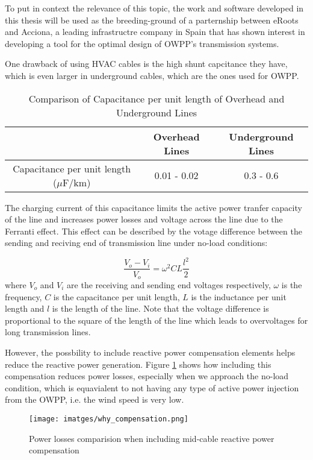 \documentclass[a4paper,11pt, titlepage, twoside]{article}
\begin{document}
To put in context the relevance of this topic, the work and software developed in this thesis will be used
as the breeding-ground of a parternship between eRoots and Acciona, a leading infrastructre company in Spain that has shown interest in developing a tool for the optimal design
of OWPP's transmission systems.

One drawback of using HVAC cables is the high shunt capcitance they have, which is even larger in underground cables,
which are the ones used for OWPP.

\begin{table}[h]
    \centering
    \begin{tabular}{|c|c|c|}
    \hline
     & Overhead Lines & Underground Lines \\
     \hline
    Capacitance per unit length ($\mu$F/km) & 0.01 - 0.02  & 0.3 - 0.6 \\
    \hline
    \end{tabular}
    \caption{Comparison of Capacitance per unit length of Overhead and Underground Lines}
    \label{tab:capacitance_comparison}
    \end{table}

The charging current of this capacitance limits the active power tranfer capacity of the line and increases
power losses and voltage across the line due to the Ferranti effect\cite{ferranti}. This effect can be described by the votage difference between the sending and reciving end of transmission line under no-load conditions:

\begin{equation}
    \frac{V_{o} - V_{i}}{V_{o}} = \omega^2CL\frac{l^2}{2}
\end{equation}
where $V_{o}$ and $V_{i}$ are the receiving and sending end voltages respectively, $\omega$ is the frequency, $C$ is the capacitance per unit length, $L$ is the inductance per unit length and $l$ is the length of the line. Note that the voltage difference is
proportional to the square of the length of the line which leads to overvoltages for long transmission lines.\par

However, the possbility to include reactive power compensation elements helps reduce the reactive power generation. Figure \ref{fig:whycomp} shows how including
this compensation reduces power losses, especially when we approach the no-load condition, which is equavialent to not having any type of active power injection from
the OWPP, i.e. the wind speed is very low.
\begin{figure}[h] %
	\centering
	\texttt{[image: imatges/why\_compensation.png]}
	\caption{Power losses comparision when including mid-cable reactive power compensation}
	\label{fig:whycomp} %
\end{figure}
\end{document}
